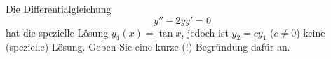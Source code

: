 \begin{atiTask}[
	title = Weitere Fragen,
	language = Deutsch
]
	\begin{atiSubtasks}
	
	\item Die Differentialgleichung
	\[
	y''-2yy'=0
	\]
	hat die spezielle Lösung $y_1(x)=\tan x$, jedoch ist $y_2=cy_1$ ($c\neq 0$) keine (spezielle) Lösung. Geben Sie eine kurze (!) Begründung dafür an.
	

\end{atiSubtasks}
\end{atiTask}
